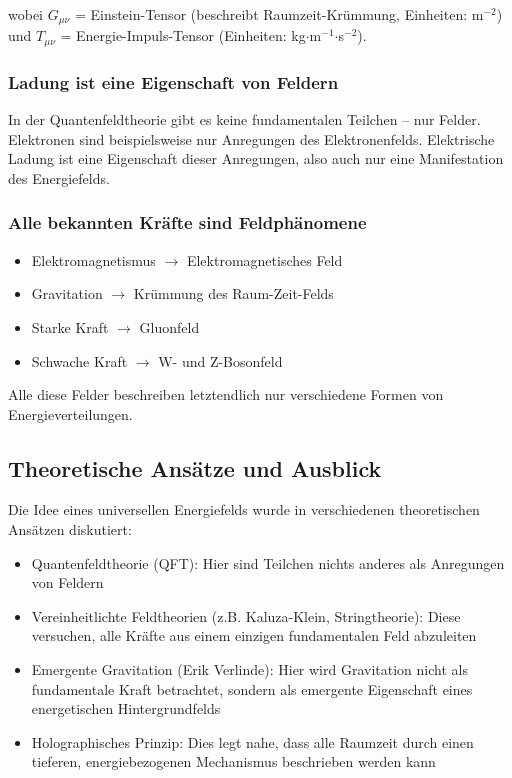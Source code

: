 \documentclass[12pt,a4paper]{article}
\begin{document}
	wobei $G_{\mu\nu}$ = Einstein-Tensor (beschreibt Raumzeit-Krümmung, Einheiten: m$^{-2}$) und $T_{\mu\nu}$ = Energie-Impuls-Tensor (Einheiten: kg$\cdot$m$^{-1}$$\cdot$s$^{-2}$).
	
	\subsubsection{Ladung ist eine Eigenschaft von Feldern}
	In der Quantenfeldtheorie \cite{Weinberg1995} gibt es keine fundamentalen Teilchen – nur Felder. Elektronen sind beispielsweise nur Anregungen des Elektronenfelds. Elektrische Ladung ist eine Eigenschaft dieser Anregungen, also auch nur eine Manifestation des Energiefelds.
	
	\subsubsection{Alle bekannten Kräfte sind Feldphänomene}
	\begin{itemize}
		\item Elektromagnetismus $\rightarrow$ Elektromagnetisches Feld
		\item Gravitation $\rightarrow$ Krümmung des Raum-Zeit-Felds
		\item Starke Kraft $\rightarrow$ Gluonfeld
		\item Schwache Kraft $\rightarrow$ W- und Z-Bosonfeld
	\end{itemize}
	
	Alle diese Felder beschreiben letztendlich nur verschiedene Formen von Energieverteilungen.
	
	\subsection{Theoretische Ansätze und Ausblick}
	
	Die Idee eines universellen Energiefelds wurde in verschiedenen theoretischen Ansätzen diskutiert:
	
	\begin{itemize}
		\item Quantenfeldtheorie (QFT): Hier sind Teilchen nichts anderes als Anregungen von Feldern
		\item Vereinheitlichte Feldtheorien (z.B. Kaluza-Klein, Stringtheorie): Diese versuchen, alle Kräfte aus einem einzigen fundamentalen Feld abzuleiten
		\item Emergente Gravitation (Erik Verlinde): Hier wird Gravitation nicht als fundamentale Kraft betrachtet, sondern als emergente Eigenschaft eines energetischen Hintergrundfelds
		\item Holographisches Prinzip: Dies legt nahe, dass alle Raumzeit durch einen tieferen, energiebezogenen Mechanismus beschrieben werden kann
	\end{itemize}
	
\end{document}
